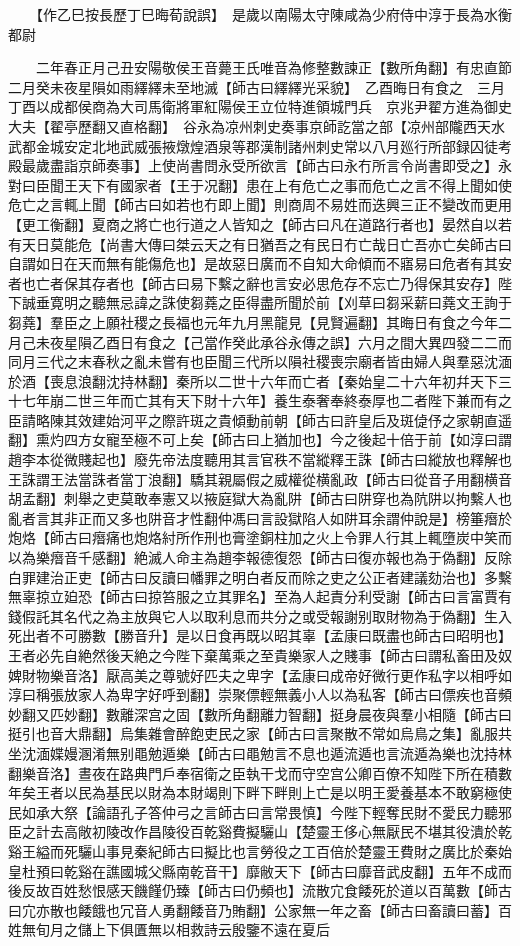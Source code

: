 　　【作乙巳按長歷丁巳晦荀說誤】　是歲以南陽太守陳咸為少府侍中淳于長為水衡都尉

　　二年春正月己丑安陽敬侯王音薨王氏唯音為修整數諫正【數所角翻】有忠直節　二月癸未夜星隕如雨繹繹未至地滅【師古曰繹繹光采貌】　乙酉晦日有食之　三月丁酉以成都侯商為大司馬衛將軍紅陽侯王立位特進領城門兵　京兆尹翟方進為御史大夫【翟亭歷翻又直格翻】　谷永為凉州刺史奏事京師訖當之部【凉州部隴西天水武都金城安定北地武威張掖燉煌酒泉等郡漢制諸州刺史常以八月廵行所部録囚徒考殿最歲盡詣京師奏事】上使尚書問永受所欲言【師古曰永冇所言令尚書即受之】永對曰臣聞王天下有國家者【王于况翻】患在上有危亡之事而危亡之言不得上聞如使危亡之言輒上聞【師古曰如若也冇即上聞】則商周不易姓而迭興三正不變改而更用【更工衡翻】夏商之將亡也行道之人皆知之【師古曰凡在道路行者也】晏然自以若有天日莫能危【尚書大傳曰桀云天之有日猶吾之有民日冇亡哉日亡吾亦亡矣師古曰自謂如日在天而無有能傷危也】是故惡日廣而不自知大命傾而不寤易曰危者有其安者也亡者保其存者也【師古曰易下繫之辭也言安必思危存不忘亡乃得保其安存】陛下誠垂寛明之聽無忌諱之誅使芻蕘之臣得盡所聞於前【刈草曰芻采薪曰蕘文王詢于芻蕘】羣臣之上願社稷之長福也元年九月黑龍見【見賢遍翻】其晦日有食之今年二月己未夜星隕乙酉日有食之【己當作癸此承谷永傳之誤】六月之間大異四發二二而同月三代之末春秋之亂未嘗有也臣聞三代所以隕社稷喪宗廟者皆由婦人與羣惡沈湎於酒【喪息浪翻沈持林翻】秦所以二世十六年而亡者【秦始皇二十六年初幷天下三十七年崩二世三年而亡其有天下財十六年】養生泰奢奉終泰厚也二者陛下兼而有之臣請略陳其效建始河平之際許斑之貴傾動前朝【師古曰許皇后及斑偼伃之家朝直遥翻】熏灼四方女寵至極不可上矣【師古曰上猶加也】今之後起十倍于前【如淳曰謂趙李本從微賤起也】廢先帝法度聽用其言官秩不當縱釋王誅【師古曰縱放也釋解也王誅謂王法當誅者當丁浪翻】驕其親屬假之威權從横亂政【師古曰從音子用翻横音胡孟翻】刺舉之吏莫敢奉憲又以掖庭獄大為亂阱【師古曰阱穿也為阬阱以拘繫人也亂者言其非正而又多也阱音才性翻仲馮曰言設獄陷人如阱耳余謂仲說是】榜箠㿊於炮烙【師古曰㿊痛也炮烙紂所作刑也膏塗銅柱加之火上令罪人行其上輒墮炭中笑而以為樂㿊音千感翻】絶滅人命主為趙李報德復怨【師古曰復亦報也為于偽翻】反除白罪建治正吏【師古曰反讀曰幡罪之明白者反而除之吏之公正者建議劾治也】多繫無辜掠立廹恐【師古曰掠笞服之立其罪名】至為人起責分利受謝【師古曰言富賈有錢假託其名代之為主放與它人以取利息而共分之或受報謝别取財物為于偽翻】生入死出者不可勝數【勝音升】是以日食再既以昭其辜【孟康曰既盡也師古曰昭明也】王者必先自絶然後天絶之今陛下棄萬乘之至貴樂家人之賤事【師古曰謂私畜田及奴婢財物樂音洛】厭高美之尊號好匹夫之卑字【孟康曰成帝好微行更作私字以相呼如淳曰稱張放家人為卑字好呼到翻】崇聚僄輕無義小人以為私客【師古曰僄疾也音頻妙翻又匹妙翻】數離深宫之固【數所角翻離力智翻】挺身晨夜與羣小相隨【師古曰挺引也音大鼎翻】烏集雜會醉飽吏民之家【師古曰言聚散不常如烏鳥之集】亂服共坐沈湎媟嫚溷淆無别黽勉遁樂【師古曰黽勉言不息也遁流遁也言流遁為樂也沈持林翻樂音洛】晝夜在路典門戶奉宿衛之臣執干戈而守空宫公卿百僚不知陛下所在積數年矣王者以民為基民以財為本財竭則下畔下畔則上亡是以明王愛養基本不敢窮極使民如承大祭【論語孔子答仲弓之言師古曰言常畏慎】今陛下輕奪民財不愛民力聽邪臣之計去高敞初陵改作昌陵役百乾谿費擬驪山【楚靈王侈心無厭民不堪其役潰於乾谿王縊而死驪山事見秦紀師古曰擬比也言勞役之工百倍於楚靈王費財之廣比於秦始皇杜預曰乾谿在譙國城父縣南乾音干】靡敝天下【師古曰靡音武皮翻】五年不成而後反故百姓愁恨感天饑饉仍臻【師古曰仍頻也】流散宂食餧死於道以百萬數【師古曰宂亦散也餧餓也冗音人勇翻餧音乃賄翻】公家無一年之畜【師古曰畜讀曰蓄】百姓無旬月之儲上下俱匱無以相救詩云殷鑒不遠在夏后